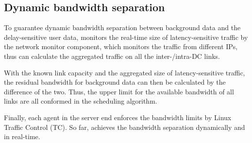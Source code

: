 \subsection{Dynamic bandwidth separation}
\label{subsec:system:separation}

To guarantee dynamic bandwidth separation between background data and the delay-sensitive user data, \name monitors the real-time size of latency-sensitive traffic by the network monitor component, which monitors the traffic from different IPs, thus can calculate the aggregated traffic on all the inter-/intra-DC links.

With the known link capacity and the aggregated size of latency-sensitive traffic, the residual bandwidth for background data can then be calculated by the difference of the two. Thus, the upper limit for the available bandwidth of all links are all conformed in the scheduling algorithm.

Finally, each agent in the server end enforces the bandwidth limits by Linux Traffic Control (TC). So far, \name achieves the bandwidth separation dynamically and in real-time.

%
%
%
%
%



